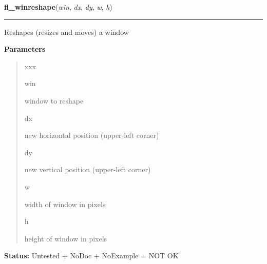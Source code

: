 \hspace{.8\funcindent}\begin{boxedminipage}{\funcwidth}

    \raggedright \textbf{fl\_winreshape}(\textit{win}, \textit{dx}, \textit{dy}, \textit{w}, \textit{h})

    \vspace{-1.5ex}

    \rule{\textwidth}{0.5\fboxrule}
\setlength{\parskip}{2ex}
    Reshapes (resizes and moves) a window

\setlength{\parskip}{1ex}
      \textbf{Parameters}
      \vspace{-1ex}

      \begin{quote}
        \begin{Ventry}{xxx}

          \item[win]

          window to reshape

          \item[dx]

          new horizontal position (upper-left corner)

          \item[dy]

          new vertical position (upper-left corner)

          \item[w]

          width of window in pixels

          \item[h]

          height of window in pixels

        \end{Ventry}

      \end{quote}

\textbf{Status:} Untested + NoDoc + NoExample = NOT OK



    \end{boxedminipage}

    \label{xformslib:library:fl_winicon}

    \vspace{0.5ex}

